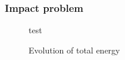 \subsubsection{Impact problem}

\begin{figure}[h!]
  \centering
  
  \caption{test}
  \label{fig:2dplane_Wave}
\end{figure}

\begin{figure}[h!]
  \centering
  
  \caption{Evolution of total energy}
  \label{fig:pw_energy}
\end{figure}
